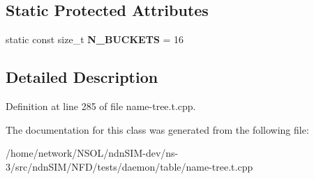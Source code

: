 \subsection*{Static Protected Attributes}
\begin{DoxyCompactItemize}
\item 
static const size\+\_\+t {\bfseries N\+\_\+\+B\+U\+C\+K\+E\+TS} = 16\hypertarget{classnfd_1_1tests_1_1EnumerationFixture_a5204bbc7c4db664bbb5c958e521f57ec}{}\label{classnfd_1_1tests_1_1EnumerationFixture_a5204bbc7c4db664bbb5c958e521f57ec}

\end{DoxyCompactItemize}


\subsection{Detailed Description}


Definition at line 285 of file name-\/tree.\+t.\+cpp.



The documentation for this class was generated from the following file\+:\begin{DoxyCompactItemize}
\item 
/home/network/\+N\+S\+O\+L/ndn\+S\+I\+M-\/dev/ns-\/3/src/ndn\+S\+I\+M/\+N\+F\+D/tests/daemon/table/name-\/tree.\+t.\+cpp\end{DoxyCompactItemize}
